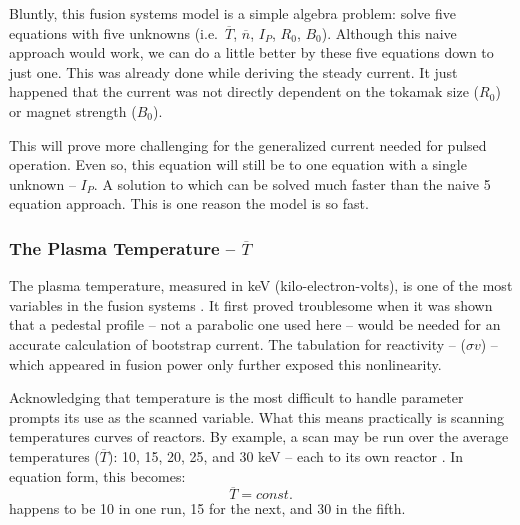 Bluntly, this fusion systems model is a simple algebra problem: solve five equations with five unknowns (i.e.\ $\overline T$, $\overline n$, $I_P$, $R_0$, $B_0$). Although this naive approach would work, we can do a little better by  these five equations down to just one. This was already done while deriving the steady current. It just happened that the current was not directly dependent on the tokamak size ($R_0$) or magnet strength ($B_0$). 

This will prove more challenging for the generalized current needed for pulsed operation. Even so, this equation will still be  to one equation with a single unknown -- $I_P$. A solution to which can be solved much faster than the naive 5 equation approach. This is one reason the model is so fast. 

\subsubsection{The Plasma Temperature -- $\overline T$}

The plasma temperature, measured in keV (kilo-electron-volts), is one of the most  variables in the fusion systems . It first proved troublesome when it was shown that a pedestal profile -- not a parabolic one used here -- would be needed for an accurate calculation of bootstrap current. The  tabulation for reactivity -- ($\sigma v$) -- which appeared in fusion power only further exposed this nonlinearity.

Acknowledging that temperature is the most difficult to handle parameter prompts its use as the scanned variable. What this means practically is scanning temperatures  curves of reactors. By example, a scan may be run over the average temperatures ($\overline T$): 10, 15, 20, 25, and 30 keV --  each  to its own reactor . In equation form, this becomes:
\begin{equation}
	\label{eq:tbar}
	\overline T = const.
\end{equation}
 happens to be 10  in one run, 15  for the next, and 30  in the fifth.

